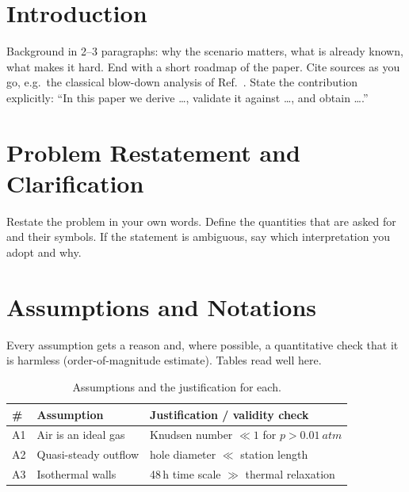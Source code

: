 \documentclass[12pt,letterpaper]{article}
\begin{document}
\tableofcontents
\clearpage

\section{Introduction}
\label{sec:intro}
Background in 2--3 paragraphs: why the scenario matters, what is already
known, what makes it hard. End with a short roadmap of the paper.
Cite sources as you go, e.g.\ the classical blow-down analysis of
Ref.~\cite{shapiro1953,anderson2003}.
State the contribution explicitly: ``In this paper we derive \ldots, validate
it against \ldots, and obtain \ldots.''

\section{Problem Restatement and Clarification}
\label{sec:problem}
Restate the problem in your own words. Define the quantities that are asked
for and their symbols. If the statement is ambiguous, say which
interpretation you adopt and why.

\section{Assumptions and Notations}
\label{sec:assumptions}
Every assumption gets a reason and, where possible, a quantitative check that
it is harmless (order-of-magnitude estimate). Tables read well here.

\begin{table}[htbp]
  \centering
  \caption{Assumptions and the justification for each.}
  \label{tab:assumptions}
  \begin{tabular}{@{}lll@{}}
    \toprule
    \# & Assumption & Justification / validity check \\
    \midrule
    A1 & Air is an ideal gas & Knudsen number $\ll 1$ for $p>\SI{0.01}{atm}$ \\
    A2 & Quasi-steady outflow & hole diameter $\ll$ station length \\
    A3 & Isothermal walls & 48\,h time scale $\gg$ thermal relaxation \\
    \bottomrule
  \end{tabular}
\end{table}
\end{document}

